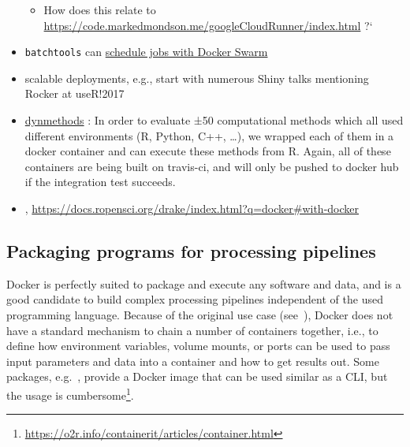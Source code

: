 \begin{itemize}
  \begin{itemize}
  \tightlist
  \item
    How does this relate to
    \url{https://code.markedmondson.me/googleCloudRunner/index.html} ?`
  \end{itemize}
\item
  \texttt{batchtools} \citep{Lang2017batchtools} can
  \href{https://mllg.github.io/batchtools/reference/makeClusterFunctionsDocker.html}{schedule
  jobs with Docker Swarm}
\item
  scalable deployments, e.g., start with numerous Shiny talks mentioning
  Rocker at useR!2017
\item
  \href{https://github.com/dynverse/dynmethods}{dynmethods}
  \citep{rcannood}: In order to evaluate ±50 computational methods which
  all used different environments (R, Python, C++, \ldots{}), we wrapped
  each of them in a docker container and can execute these methods from
  R. Again, all of these containers are being built on travis-ci, and
  will only be pushed to docker hub if the integration test succeeds.
\item
  ,
  \url{https://docs.ropensci.org/drake/index.html?q=docker\#with-docker}
\end{itemize}

\hypertarget{packaging-programs-for-processing-pipelines}{%
\subsection{Packaging programs for processing
pipelines}\label{packaging-programs-for-processing-pipelines}}

\label{packaging}

Docker is perfectly suited to package and execute any software and data,
and is a good candidate to build complex processing pipelines
independent of the used programming language. Because of the original
use case (see~), Docker does not have a standard
mechanism to chain a number of containers together, i.e., to define how
environment variables, volume mounts, or ports can be used to pass input
parameters and data into a container and how to get results out. Some
packages, e.g.~, provide a Docker image that can be
used similar as a CLI, but the usage is
cumbersome\footnote{\href{https://o2r.info/containerit/articles/container.html}{https://o2r.info/containerit/articles/container.html}}.

